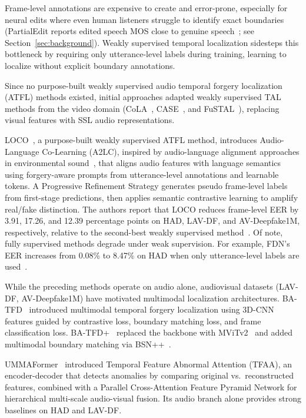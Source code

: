 \documentclass[journal]{IEEEtran}
\begin{document}
Frame-level annotations are expensive to create and error-prone, especially for neural edits where even human listeners struggle to identify exact boundaries (PartialEdit reports edited speech MOS close to genuine speech~\cite{zhang2025partialedit}; see Section~\ref{sec:background}). Weakly supervised temporal localization sidesteps this bottleneck by requiring only utterance-level labels during training, learning to localize without explicit boundary annotations.

Since no purpose-built weakly supervised audio temporal forgery localization (ATFL) methods existed, initial approaches adapted weakly supervised TAL methods from the video domain (CoLA~\cite{zhang2021cola}, CASE~\cite{liu2023case}, and FuSTAL~\cite{feng2024fustal}), replacing visual features with SSL audio representations.

LOCO~\cite{wu2025loco}, a purpose-built weakly supervised ATFL method, introduces Audio-Language Co-Learning (A2LC), inspired by audio-language alignment approaches in environmental sound~\cite{ouajdi2024envfake}, that aligns audio features with language semantics using forgery-aware prompts from utterance-level annotations and learnable tokens. A Progressive Refinement Strategy generates pseudo frame-level labels from first-stage predictions, then applies semantic contrastive learning to amplify real/fake distinction. The authors report that LOCO reduces frame-level EER by 3.91, 17.26, and 12.39 percentage points on HAD, LAV-DF, and AV-Deepfake1M, respectively, relative to the second-best weakly supervised method~\cite{wu2025loco}. Of note, fully supervised methods degrade under weak supervision. For example, FDN's EER increases from 0.08\% to 8.47\% on HAD when only utterance-level labels are used~\cite{wu2025loco}.



While the preceding methods operate on audio alone, audiovisual datasets (LAV-DF, AV-Deepfake1M) have motivated multimodal localization architectures. BA-TFD~\cite{cai2022lavdf} introduced multimodal temporal forgery localization using 3D-CNN features guided by contrastive loss, boundary matching loss, and frame classification loss. BA-TFD+~\cite{cai2023lavdf_cviu} replaced the backbone with MViTv2~\cite{li2022mvitv2} and added multimodal boundary matching via BSN++~\cite{fan2021bsn}.

UMMAFormer~\cite{zhang2023ummaformer} introduced Temporal Feature Abnormal Attention (TFAA), an encoder-decoder that detects anomalies by comparing original vs.\ reconstructed features, combined with a Parallel Cross-Attention Feature Pyramid Network for hierarchical multi-scale audio-visual fusion. Its audio branch alone provides strong baselines on HAD and LAV-DF.
\end{document}
